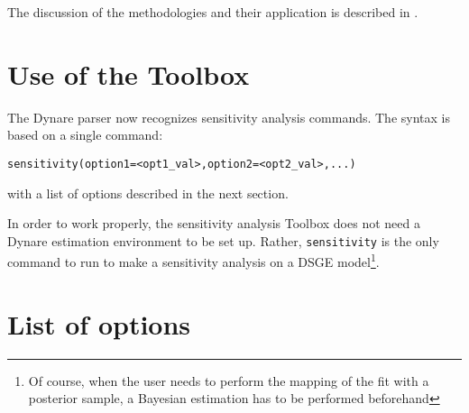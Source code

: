 \documentclass[12pt,a4paper]{article}
\begin{document}
The discussion of the methodologies and their application is
described in \cite{Ratto_CompEcon_2008}.


\section{Use of the Toolbox}
The Dynare parser now recognizes sensitivity analysis commands.
The syntax is based on a single command:
\vspace{0.5cm}

\verb"sensitivity(option1=<opt1_val>,option2=<opt2_val>,...)"

\vspace{0.5cm} \noindent with a list of options described in the
next section.

In order to work properly, the sensitivity analysis Toolbox does not need
a Dynare estimation environment to be set up. Rather, \verb"sensitivity"
is the only command to run to
make a sensitivity analysis on a DSGE model\footnote{Of course,
when the user needs to perform the mapping of the fit with a
posterior sample, a Bayesian estimation has to be performed
beforehand}.


\section{List of options}
\end{document}
